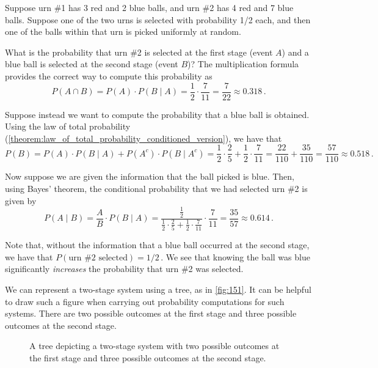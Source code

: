 \begin{example}
    Suppose urn \#1 has 3 red and 2 blue balls, and urn \#2 has 4 red and 7 blue balls. Suppose one of the two urns is selected with probability 1/2 each, and then one of the balls within that urn is picked uniformly at random.

    What is the probability that urn \#2 is selected at the first stage (event $A$) and a blue ball is selected at the second stage (event $B$)? The multiplication formula provides the correct way to compute this probability as
    $$
        P(A \cap B) = P(A)\cdot P(B \mid A)=\frac{1}{2} \cdot \frac{7}{11} = \frac{7}{22}\approx0.318\,.
    $$

    Suppose instead we want to compute the probability that a blue ball is obtained. Using the law of total probability (\autoref{theorem:law_of_total_probability_conditioned_version}), we have that
    $$
        P(B)=P(A)\cdot{}P(B\mid{}A)+P(A^c)\cdot{}P(B\mid{}A^c)=\frac{1}{2}\cdot\frac{2}{5}+\frac{1}{2}\cdot\frac{7}{11}=\frac{22}{110}+\frac{35}{110}=\frac{57}{110}\approx0.518\,.
    $$

    Now suppose we are given the information that the ball picked is blue. Then, using Bayes' theorem, the conditional probability that we had selected urn \#2 is given by
    $$
        P(A\mid B)=\frac{A}{B}\cdot P(B\mid A)= \frac {\frac{1}{2}} {\frac{1}{2}\cdot\frac{2}{5}+\frac{1}{2}\cdot\frac{7}{11}} \cdot \frac{7}{11} = \frac{35}{57}\approx0.614\,.
    $$

    Note that, without the information that a blue ball occurred at the second stage, we have that $P(\text{urn \#2 selected})=1/2$\,. We see that knowing the ball was blue significantly \emph{increases} the probability that urn \#2 was selected.
\end{example}
We can represent a two-stage system using a tree, as in \autoref{fig:151}. It can be helpful to draw such a figure when carrying out probability computations for such systems. There are two possible outcomes at the first stage and three possible outcomes at the second stage.
\begin{figure}[h]
\caption{A tree depicting a two-stage system with two possible outcomes at the first stage and three possible outcomes at the second stage.\label{fig:151}}
\end{figure}

